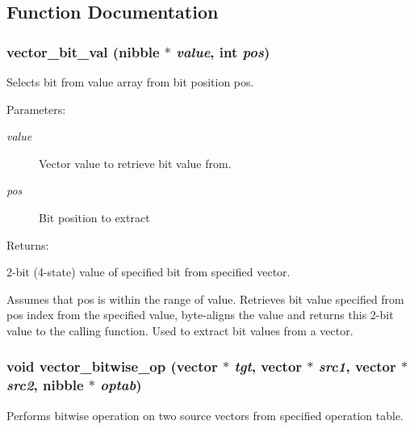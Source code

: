 \subsection{Function Documentation}
\subsubsection{ vector\_\-bit\_\-val ({\bf nibble} $\ast$ {\em value}, int {\em pos})}\label{vector_8c_a18}


Selects bit from value array from bit position pos.

\begin{Desc}
\item[Parameters: ]\par
\begin{description}
\item[{\em 
value}]Vector value to retrieve bit value from. \item[{\em 
pos}]Bit position to extract \end{description}
\end{Desc}
\begin{Desc}
\item[Returns: ]\par
2-bit (4-state) value of specified bit from specified vector.\end{Desc}
Assumes that pos is within the range of value. Retrieves bit value specified from pos index from the specified value, byte-aligns the value and returns this 2-bit value to the calling function. Used to extract bit values from a vector. 
\subsubsection{\setlength{\rightskip}{0pt plus 5cm}void vector\_\-bitwise\_\-op ({\bf vector} $\ast$ {\em tgt}, {\bf vector} $\ast$ {\em src1}, {\bf vector} $\ast$ {\em src2}, {\bf nibble} $\ast$ {\em optab})}\label{vector_8c_a35}


Performs bitwise operation on two source vectors from specified operation table.

